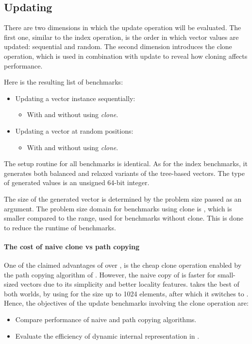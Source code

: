 \subsection{Updating}
There are two dimensions in which the update operation will be evaluated. The first one, similar to the index operation, is the order in which vector values are updated: sequential and random. The second dimension introduces the clone operation, which is used in combination with update to reveal how cloning affects performance. 

Here is the resulting list of benchmarks:
\begin{itemize}
    \item Updating a vector instance sequentially:
    \begin{itemize}        
        \item With and without using \emph{clone}.
    \end{itemize}
    \item Updating a vector at random positions:
    \begin{itemize}
        \item With and without using \emph{clone}.
    \end{itemize}  
\end{itemize}

The setup routine for all benchmarks is identical. As for the index benchmarks, it generates both balanced and relaxed variants of the tree-based vectors. The type of generated values is an unsigned 64-bit integer. 

The size of the generated vector is determined by the problem size passed as an argument. The problem size domain for benchmarks using clone is \range{[10, 20000]}, which is smaller compared to the \range{[10, 100000]} range, used for benchmarks without clone. This is done to reduce the runtime of benchmarks. 

\paragraph*{The cost of naive clone vs path copying}
One of the claimed advantages of \rbvec{} over \stdvec{}, is the cheap clone operation enabled by the path copying  algorithm of \rbtree{}. However, the naive copy of \stdvec{} is faster for small-sized vectors due to its simplicity and better locality features. \pvec{} takes the best of both worlds, by using \stdvec{} for the size up to 1024 elements, after which it switches to \rbvec{}. Hence, the objectives of the update benchmarks involving the clone operation are:
\begin{itemize}
    \item Compare performance of naive and path copying algorithms. 
    \item Evaluate the efficiency of dynamic internal representation in \pvec{}.  
\end{itemize}

